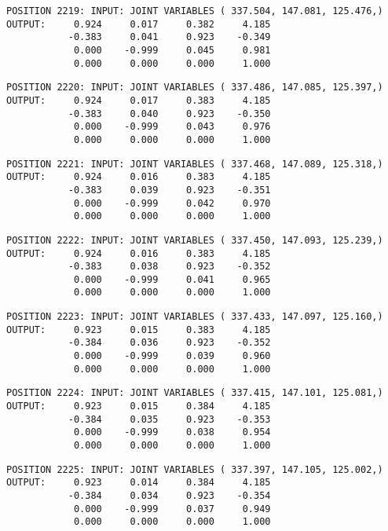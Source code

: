 \begin{verbatim}
POSITION 2219: INPUT: JOINT VARIABLES ( 337.504, 147.081, 125.476,)
OUTPUT:     0.924     0.017     0.382     4.185
           -0.383     0.041     0.923    -0.349
            0.000    -0.999     0.045     0.981
            0.000     0.000     0.000     1.000
\end{verbatim} \pagebreak[1]\begin{verbatim}
POSITION 2220: INPUT: JOINT VARIABLES ( 337.486, 147.085, 125.397,)
OUTPUT:     0.924     0.017     0.383     4.185
           -0.383     0.040     0.923    -0.350
            0.000    -0.999     0.043     0.976
            0.000     0.000     0.000     1.000
\end{verbatim} \pagebreak[1]\begin{verbatim}
POSITION 2221: INPUT: JOINT VARIABLES ( 337.468, 147.089, 125.318,)
OUTPUT:     0.924     0.016     0.383     4.185
           -0.383     0.039     0.923    -0.351
            0.000    -0.999     0.042     0.970
            0.000     0.000     0.000     1.000
\end{verbatim} \pagebreak[1]\begin{verbatim}
POSITION 2222: INPUT: JOINT VARIABLES ( 337.450, 147.093, 125.239,)
OUTPUT:     0.924     0.016     0.383     4.185
           -0.383     0.038     0.923    -0.352
            0.000    -0.999     0.041     0.965
            0.000     0.000     0.000     1.000
\end{verbatim} \pagebreak[1]\begin{verbatim}
POSITION 2223: INPUT: JOINT VARIABLES ( 337.433, 147.097, 125.160,)
OUTPUT:     0.923     0.015     0.383     4.185
           -0.384     0.036     0.923    -0.352
            0.000    -0.999     0.039     0.960
            0.000     0.000     0.000     1.000
\end{verbatim} \pagebreak[1]\begin{verbatim}
POSITION 2224: INPUT: JOINT VARIABLES ( 337.415, 147.101, 125.081,)
OUTPUT:     0.923     0.015     0.384     4.185
           -0.384     0.035     0.923    -0.353
            0.000    -0.999     0.038     0.954
            0.000     0.000     0.000     1.000
\end{verbatim} \pagebreak[1]\begin{verbatim}
POSITION 2225: INPUT: JOINT VARIABLES ( 337.397, 147.105, 125.002,)
OUTPUT:     0.923     0.014     0.384     4.185
           -0.384     0.034     0.923    -0.354
            0.000    -0.999     0.037     0.949
            0.000     0.000     0.000     1.000
\end{verbatim} \pagebreak[1]\begin{verbatim}

\end{verbatim}
